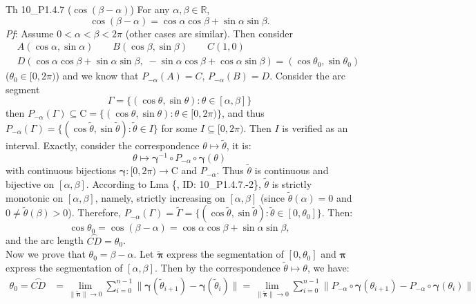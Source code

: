 \documentclass{article}
\begin{document}
\begin{Th}{Th 10\_P1.4.7 ($\cos (\beta - \alpha)$)}
    For any $\alpha, \beta\in\mathbb{R}$, 
    $$ \cos (\beta - \alpha) = \cos \alpha \cos \beta + \sin \alpha \sin \beta. $$
    \tcblower
    \textit{Pf}: Assume $0< \alpha < \beta < 2\pi$ (other cases are similar). Then consider
    $$ \begin{aligned}
        & A(\cos\alpha, \sin\alpha) \qquad B(\cos\beta, \sin\beta) \qquad C(1, 0) \\
        & D(\cos\alpha\cos\beta + \sin\alpha\sin\beta, \; -\sin\alpha\cos\beta + \cos\alpha\sin\beta) = (\cos\theta_0, \sin\theta_0) 
    \end{aligned} $$
    ($\theta_0\in [0,2\pi)$) and we know that $P_{-\alpha}(A) = C$, $P_{-\alpha}(B) = D$. Consider the arc segment 
    $$ \varGamma = \{(\cos\theta, \sin\theta): \theta\in [\alpha, \beta]\} $$
    then $P_{-\alpha}(\varGamma)\subseteq \mathrm{C} = \{(\cos\theta, \sin\theta): \theta\in [0, 2\pi)\}$, and thus $P_{-\alpha}(\varGamma) = \{(\cos\tilde{\theta}, \sin\tilde{\theta}): \tilde{\theta}\in I\}$ for some $I\subseteq [0, 2\pi)$. Then $I$ is verified as an interval. Exactly, consider the correspondence $\theta\mapsto\tilde{\theta}$, it is:
    $$ \theta\mapsto \pmb{\gamma}^{-1}\circ P_{-\alpha}\circ \pmb{\gamma}(\theta) $$
    with continuous bijections $\pmb{\gamma}: [0, 2\pi)\rightarrow \mathrm{C}$ and $P_{-\alpha}$. Thus $\tilde{\theta}$ is continuous and bijective on $[\alpha, \beta]$. According to Lma \{, ID: 10\_P1.4.7.-2\}, $\tilde{\theta}$ is strictly monotonic on $[\alpha, \beta]$, namely, strictly increasing on $[\alpha, \beta]$ (since $\tilde{\theta}(\alpha) = 0$ and $0 \neq \tilde{\theta}(\beta) > 0$). Therefore, $P_{-\alpha}(\varGamma) = \tilde{\varGamma} = \{(\cos\tilde{\theta}, \sin\tilde{\theta}): \tilde{\theta}\in [0, \theta_0]\}$. Then:
    $$ \cos\theta_0 = \cos(\beta - \alpha) = \cos\alpha\cos\beta + \sin\alpha\sin\beta, $$
    and the arc length $\overset{\frown}{CD} = \theta_0$. \\
    Now we prove that $\theta_0 = \beta - \alpha$. Let $\tilde{\pmb{\pi}}$ express the segmentation of $[0, \theta_0]$ and $\pmb{\pi}$ express the segmentation of $[\alpha, \beta]$. Then by the correspondence $\tilde{\theta}\mapsto \theta$, we have:
    $$ 
    \begin{aligned}
        \theta_0 = \overset{\frown}{CD} &= \lim\limits_{\|\tilde{\pmb{\pi}}\|\to 0} \sum_{i=0}^{n-1} \|\pmb{\gamma}(\tilde{\theta}_{i+1}) - \pmb{\gamma}(\tilde{\theta}_i)\| = \lim\limits_{\|\tilde{\pmb{\pi}}\|\to 0} \sum_{i=0}^{n-1} \|P_{-\alpha}\circ \pmb{\gamma}(\theta_{i+1}) - P_{-\alpha}\circ \pmb{\gamma}(\theta_i)\| \\

\end{aligned}$$
\end{Th}
\end{document}
